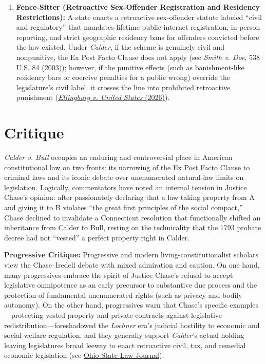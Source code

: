 \documentclass[12pt]{article}
\begin{document}
\begin{enumerate}
  \item \textbf{Fence-Sitter (Retroactive Sex-Offender Registration and Residency Restrictions):} A state enacts a retroactive sex-offender statute labeled ``civil and regulatory'' that mandates lifetime public internet registration, in-person reporting, and strict geographic residency bans for offenders convicted before the law existed. Under \textit{Calder}, if the scheme is genuinely civil and nonpunitive, the Ex Post Facto Clause does not apply (see \textit{Smith v. Doe}, 538 U.S. 84 (2003)); however, if the punitive effects (such as banishment-like residency bars or coercive penalties for a public wrong) override the legislature's civil label, it crosses the line into prohibited retroactive punishment (\href{https://www.supremecourt.gov/opinions/25pdf/24-482_d1oe.pdf}{\textit{Ellingburg v. United States} (2026)}).
\end{enumerate}

\section{Critique}

\textit{Calder v. Bull} occupies an enduring and controversial place in American constitutional law on two fronts: its narrowing of the Ex Post Facto Clause to criminal laws and its iconic debate over unenumerated natural-law limits on legislation. Logically, commentators have noted an internal tension in Justice Chase's opinion: after passionately declaring that a law taking property from A and giving it to B violates ``the great first principles of the social compact,'' Chase declined to invalidate a Connecticut resolution that functionally shifted an inheritance from Calder to Bull, resting on the technicality that the 1793 probate decree had not ``vested'' a perfect property right in Calder.

\textbf{Progressive Critique:} Progressive and modern living-constitutionalist scholars view the Chase--Iredell debate with mixed admiration and caution. On one hand, many progressives embrace the spirit of Justice Chase's refusal to accept legislative omnipotence as an early precursor to substantive due process and the protection of fundamental unenumerated rights (such as privacy and bodily autonomy). On the other hand, progressives warn that Chase's specific examples---protecting vested property and private contracts against legislative redistribution---foreshadowed the \textit{Lochner} era's judicial hostility to economic and social-welfare regulation, and they generally support \textit{Calder}'s actual holding leaving legislatures broad leeway to enact retroactive civil, tax, and remedial economic legislation (see \href{https://kb.osu.edu/bitstreams/177d2af3-9d00-5fe4-af96-0073e9b3e460/download}{Ohio State Law Journal}).
\end{document}
